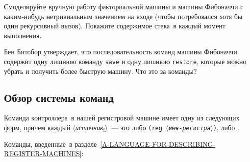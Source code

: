 \begin{exercise}{5.5}%
\label{EX5.5}%
Смоделируйте вручную работу факториальной машины и
машины Фибоначчи с каким-нибудь нетривиальным значением на входе
(чтобы потребовался хотя бы один рекурсивный вызов). Покажите
содержимое стека~в каждый момент выполнения.
\end{exercise}
\begin{exercise}{5.6}%
\label{EX5.6}%
Бен Битобор утверждает, что последовательность команд
машины Фибоначчи содержит одну лишнюю команду {\tt save} и одну
лишнюю {\tt restore}, которые можно убрать и получить более
быструю машину.  Что это за команды?
\end{exercise}

\subsection{Обзор системы команд}
\label{INSTRUCTION-SUMMARY}

Команда контроллера~в нашей регистровой машине имеет одну
из следующих форм, причем каждый
\textit{$\langle$источник${}_{\mbox{i}}$$\rangle$}~--- это либо
{\tt (reg \textit{$\langle$имя-регистра$\rangle$})}, либо  .
\sloppy

Команды, введенные~в 
разделе~\ref{A-LANGUAGE-FOR-DESCRIBING-REGISTER-MACHINES}:

